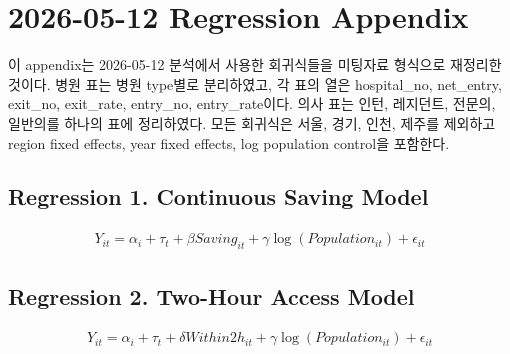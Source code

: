 \documentclass[a4paper, 10pt]{article}
\begin{document}
\tableofcontents
\newpage
\section{2026-05-12 Regression Appendix}
이 appendix는 2026-05-12 분석에서 사용한 회귀식들을 미팅자료 형식으로 재정리한 것이다.
병원 표는 병원 type별로 분리하였고, 각 표의 열은 hospital\_no, net\_entry, exit\_no, exit\_rate, entry\_no, entry\_rate이다.
의사 표는 인턴, 레지던트, 전문의, 일반의를 하나의 표에 정리하였다.
모든 회귀식은 서울, 경기, 인천, 제주를 제외하고 region fixed effects, year fixed effects, log population control을 포함한다.

\subsection{Regression 1. Continuous Saving Model}
\begin{align*}
    Y_{it}=\alpha_i+\tau_t+\beta Saving_{it}+\gamma\log(Population_{it})+\epsilon_{it}
\end{align*}
\begin{table}[H]
\centering
\caption{Regression 1. Continuous Saving Model: 의원}

\end{table}

\begin{table}[H]
\centering
\caption{Regression 1. Continuous Saving Model: 병원}

\end{table}

\begin{table}[H]
\centering
\caption{Regression 1. Continuous Saving Model: 종합병원}

\end{table}

\begin{table}[H]
\centering
\caption{Regression 1. Continuous Saving Model: 상급종합병원}

\end{table}

\begin{table}[H]
\centering
\caption{Regression 1. Continuous Saving Model: 의사}

\end{table}

\subsection{Regression 2. Two-Hour Access Model}
\begin{align*}
    Y_{it}=\alpha_i+\tau_t+\delta Within2h_{it}+\gamma\log(Population_{it})+\epsilon_{it}
\end{align*}
\begin{table}[H]
\centering
\caption{Regression 2. Two-Hour Access Model: 의원}

\end{table}
\end{document}
